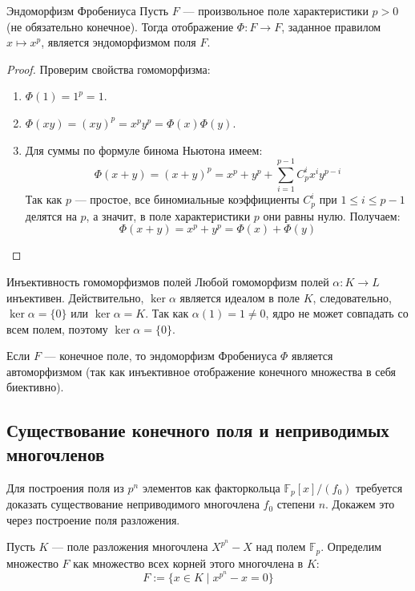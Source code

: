\begin{Proposition}{Эндоморфизм Фробениуса}{}
	Пусть $F$ --- произвольное поле характеристики $p > 0$ (не обязательно конечное). Тогда отображение $\Phi: F \to F$, заданное правилом $x \mapsto x^p$, является эндоморфизмом поля $F$.
\end{Proposition}

\begin{proof}
	Проверим свойства гомоморфизма:
	\begin{enumerate}
		\item $\Phi(1) = 1^p = 1$.
		\item $\Phi(xy) = (xy)^p = x^p y^p = \Phi(x)\Phi(y)$.
		\item Для суммы по формуле бинома Ньютона имеем:
		\[ \Phi(x+y) = (x+y)^p = x^p + y^p + \sum_{i=1}^{p-1} C_p^i x^i y^{p-i} \]
		Так как $p$ --- простое, все биномиальные коэффициенты $C_p^i$ при $1 \le i \le p-1$ делятся на $p$, а значит, в поле характеристики $p$ они равны нулю. Получаем:
		\[ \Phi(x+y) = x^p + y^p = \Phi(x) + \Phi(y) \]
	\end{enumerate}
\end{proof}

\begin{Remark}{Инъективность гомоморфизмов полей}{}
	Любой гомоморфизм полей $\alpha: K \to L$ инъективен. Действительно, $\ker \alpha$ является идеалом в поле $K$, следовательно, $\ker \alpha = \{0\}$ или $\ker \alpha = K$. Так как $\alpha(1) = 1 \neq 0$, ядро не может совпадать со всем полем, поэтому $\ker \alpha = \{0\}$.
\end{Remark}

\begin{Corollary}{}{}
	Если $F$ --- конечное поле, то эндоморфизм Фробениуса $\Phi$ является автоморфизмом (так как инъективное отображение конечного множества в себя биективно).
\end{Corollary}

\subsection{Существование конечного поля и неприводимых многочленов}

Для построения поля из $p^n$ элементов как факторкольца $\mathbb{F}_p[x]/(f_0)$ требуется доказать существование неприводимого многочлена $f_0$ степени $n$. Докажем это через построение поля разложения.

Пусть $K$ --- поле разложения многочлена $X^{p^n} - X$ над полем $\mathbb{F}_p$. 
Определим множество $F$ как множество всех корней этого многочлена в $K$:
\[ F := \{ x \in K \mid x^{p^n} - x = 0 \} \]


